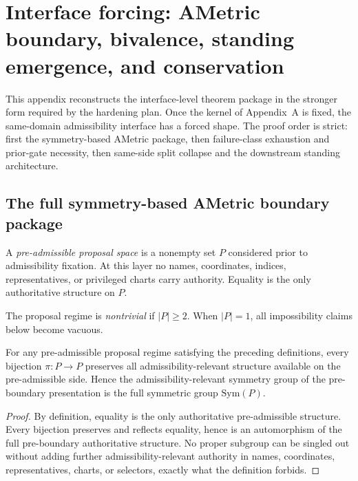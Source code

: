 \section{Interface forcing: AMetric boundary, bivalence, standing emergence, and conservation}
\label{app:interface}

This appendix reconstructs the interface-level theorem package in the stronger form required by the hardening plan. Once the kernel of Appendix~A is fixed, the same-domain admissibility interface has a forced shape. The proof order is strict: first the symmetry-based AMetric package, then failure-class exhaustion and prior-gate necessity, then same-side split collapse and the downstream standing architecture.

\subsection{The full symmetry-based AMetric boundary package}

\begin{definition}
A \emph{pre-admissible proposal space} is a nonempty set $P$ considered prior to admissibility fixation. At this layer no names, coordinates, indices, representatives, or privileged charts carry authority. Equality is the only authoritative structure on $P$.
\end{definition}

\begin{definition}
The proposal regime is \emph{nontrivial} if $|P|\ge 2$. When $|P|=1$, all impossibility claims below become vacuous.
\end{definition}

\begin{theorem}
\label{thm:B-full-symmetry}
For any pre-admissible proposal regime satisfying the preceding definitions, every bijection $\pi:P\to P$ preserves all admissibility-relevant structure available on the pre-admissible side. Hence the admissibility-relevant symmetry group of the pre-boundary presentation is the full symmetric group $\mathrm{Sym}(P)$.
\end{theorem}

\begin{proof}
By definition, equality is the only authoritative pre-admissible structure. Every bijection preserves and reflects equality, hence is an automorphism of the full pre-boundary authoritative structure. No proper subgroup can be singled out without adding further admissibility-relevant authority in names, coordinates, representatives, charts, or selectors, exactly what the definition forbids.
\end{proof}

